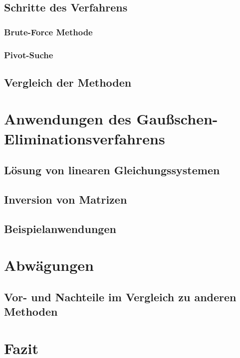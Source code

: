 \documentclass[a4paper, 12pt]{report}
\begin{document}
\section{Schritte des Verfahrens}
\subsection{Brute-Force Methode}
\subsection{Pivot-Suche}
\section{Vergleich der Methoden}
\chapter{Anwendungen des Gaußschen-Eliminationsverfahrens}
\section{Lösung von linearen Gleichungssystemen}
\section{Inversion von Matrizen}
\section{Beispielanwendungen}
\chapter{Abwägungen}
\section{Vor- und Nachteile im Vergleich zu anderen Methoden}
\chapter{Fazit}
\end{document}
